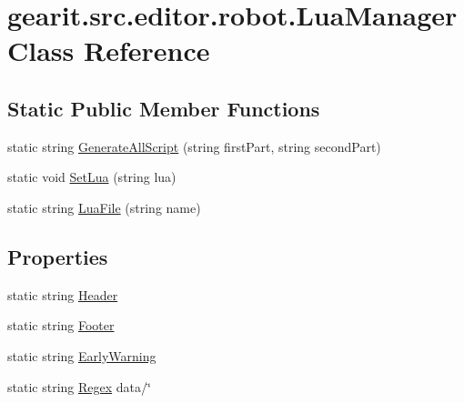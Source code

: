 \hypertarget{classgearit_1_1src_1_1editor_1_1robot_1_1_lua_manager}{\section{gearit.\+src.\+editor.\+robot.\+Lua\+Manager Class Reference}
\label{classgearit_1_1src_1_1editor_1_1robot_1_1_lua_manager}
}
\subsection*{Static Public Member Functions}
\begin{DoxyCompactItemize}
\item 
static string \hyperlink{classgearit_1_1src_1_1editor_1_1robot_1_1_lua_manager_a9ef8e1dd3db359e7c872adf35b8b749e}{Generate\+All\+Script} (string first\+Part, string second\+Part)
\item 
static void \hyperlink{classgearit_1_1src_1_1editor_1_1robot_1_1_lua_manager_a8ec651edddcd933a3038811fc31089ba}{Set\+Lua} (string lua)
\item 
static string \hyperlink{classgearit_1_1src_1_1editor_1_1robot_1_1_lua_manager_a79ad0d31e32aefaf02b8c134ff0f8f2c}{Lua\+File} (string name)
\end{DoxyCompactItemize}
\subsection*{Properties}
\begin{DoxyCompactItemize}
\item 
static string \hyperlink{classgearit_1_1src_1_1editor_1_1robot_1_1_lua_manager_a97a912f9652a6f7d43eabf8339f48cc1}{Header}
\item 
static string \hyperlink{classgearit_1_1src_1_1editor_1_1robot_1_1_lua_manager_a9cdcd2f0f1c6756eeca0791c3f444345}{Footer}
\item 
static string \hyperlink{classgearit_1_1src_1_1editor_1_1robot_1_1_lua_manager_a1f442a49fa85984b31c043ff16c2fc53}{Early\+Warning}
\item 
static string \hyperlink{classgearit_1_1src_1_1editor_1_1robot_1_1_lua_manager_a21a92da7a2584882102819b50d0381e1}{Regex} data/\char`\"{}
\end{DoxyCompactItemize}


